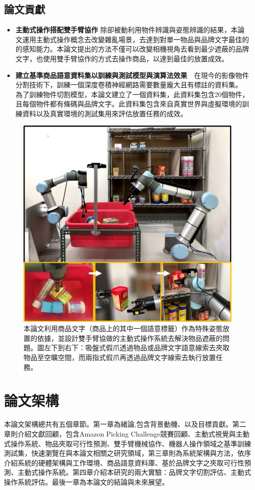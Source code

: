 \subsection{論文貢獻}
\begin{itemize}
\item \textbf{主動式操作搭配雙手臂協作} 除卻被動利用物件辨識與姿態辨識的結果，本論文運用主動式操作概念去改變雜亂場景，去達到對單一物品與品牌文字最佳的的感知能力。本論文提出的方法不僅可以改變相機視角去看到最少遮蔽的品牌文字，也使用雙手臂協作的方式去操作商品，以達到最佳的放置成效。
\item \textbf{建立基準商品語意資料集以訓練與測試模型與演算法效果}　在現今的影像物件分割技術下，訓練一個深度卷積神經網路需要數量龐大且有標註的資料集。
為了訓練物件切割模型，本論文建立了一個資料集，此資料集包含20個物件，且每個物件都有條碼與品牌文字。此資料集包含來自真實世界與虛擬環境的訓練資料以及真實環境的測試集用來評估放置任務的成效。
\end{itemize}

\begin{figure}[ht]
	\centering
	\includegraphics[height=!, width=0.7\linewidth, keepaspectratio=true]
	{./figures/pose-aware-placing-teaser-v3.jpg}
  \caption{本論文利用商品文字（商品上的其中一個語意標籤）作為特殊姿態放置的依據，並設計雙手臂協做的主動式操作系統去解決物品遮蔽的問題。圖左下到右下：吸盤式假爪透過物品或品牌文字語意線索去夾取物品至空曠空間，而兩指式假爪再透過品牌文字線索去執行放置任務。}
  \label{figure:teaser}
\end{figure}

\section{論文架構}
本論文架構總共有五個章節。第一章為緒論,包含背景動機、以及目標貢獻。第二章則介紹文獻回顧，包含Amazon Picking Challenge競賽回顧、主動式視覺與主動式操作系統、物品夾取可行性預測、雙手臂機械協作、機器人操作領域之基準訓練測試集，快速瀏覽在與本論文相關之研究領域，第三章則為系統架構與方法，依序介紹系統的硬體架構與工作環境、商品語意資料庫、基於品牌文字之夾取可行性預測、主動式操作系統。第四章介紹本研究的兩大實驗：品牌文字切割評估、主動式操作系統評估。最後一章為本論文的結論與未來展望。
